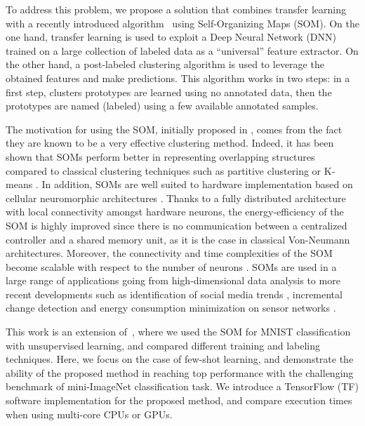 \documentclass[runningheads]{llncs}
\begin{document}
To address this problem, we propose a solution that combines transfer learning with a recently introduced algorithm~\cite{khacef2019self-organizing_neurons} using Self-Organizing Maps (SOM). On the one hand, transfer learning is used to exploit a Deep Neural Network (DNN) trained on a large collection of labeled data as a ``universal'' feature extractor. On the other hand, a post-labeled clustering algorithm is used to leverage the obtained features and make predictions. This algorithm works in two steps: in a first step, clusters prototypes are learned using no annotated data, then the prototypes are named (labeled) using a few available annotated samples.

The motivation for using the SOM, initially proposed in \cite{kohonen1990som}, comes from the fact they are known to be a very effective clustering method. Indeed, it has been shown that SOMs perform better in representing overlapping structures compared to classical clustering techniques such as partitive clustering or K-means \cite{budayan2009cluster_vs_som}. In addition, SOMs are well suited to hardware implementation based on cellular neuromorphic architectures \cite{sousa2017embedded_som} \cite{khacef2018neuromorphic_hardware} \cite{rodriguez2018grid_som}. Thanks to a fully distributed architecture with local connectivity amongst hardware neurons, the energy-efficiency of the SOM is highly improved since there is no communication between a centralized controller and a shared memory unit, as it is the case in classical Von-Neumann architectures. Moreover, the connectivity and time complexities of the SOM become scalable with respect to the number of neurons \cite{rodriguez2018grid_som}. SOMs are used in a large range of applications \cite{kohonen1996som_app} going from high-dimensional data analysis to more recent developments such as identification of social media trends \cite{silva2018social_media}, incremental change detection \cite{nallaperuma2018bahavior_changes} and energy consumption minimization on sensor networks \cite{kromes2019lorawan}.

This work is an extension of~\cite{khacef2019self-organizing_neurons}, where we used the SOM for MNIST \cite{lecun1998mnist} classification with unsupervised learning, and compared different training and labeling techniques. Here, we focus on the case of few-shot learning, and demonstrate the ability of the proposed method in reaching top performance with the challenging benchmark of mini-ImageNet classification task. We introduce a TensorFlow (TF) software implementation for the proposed method, and compare execution times when using multi-core CPUs or GPUs.
\end{document}
